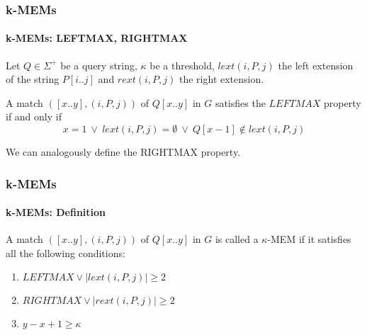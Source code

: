 \begin{frame}
	\frametitle{k-MEMs}
	\framesubtitle{k-MEMs: LEFTMAX, RIGHTMAX}
	Let \(Q \in \Sigma^+\) be a query string, \(\kappa\) be a threshold, \(lext(i, P, j)\) the left extension
	of the string \(P[i..j]\) and \(rext(i, P, j)\) the right extension.

	\begin{definition}[LEFTMAX]
		A match \(([x..y], (i, P, j))\) of \(Q[x..y]\) in \(G\) satisfies the \(LEFTMAX\) property
		if and only if
		\[
			x = 1 \ \vee \ lext(i, P, j) = \emptyset \ \vee \ Q[x-1] \notin lext(i, P, j)
		\]
	\end{definition}

	We can analogously define the RIGHTMAX property.
\end{frame}

\begin{frame}
	\frametitle{k-MEMs}
	\framesubtitle{k-MEMs: Definition}
	\begin{definition}
		A match \(([x..y], (i, P, j))\) of \(Q[x..y]\) in \(G\) is called a \(\kappa\)-MEM if it satisfies
		all the following conditions:
		\begin{enumerate}
			\item \(LEFTMAX \vee |lext(i, P, j)| \geq 2 \)
			\item \(RIGHTMAX \vee |rext(i, P, j)| \geq 2 \)
			\item \(y - x + 1 \geq \kappa\)
		\end{enumerate}
	\end{definition}
\end{frame}

